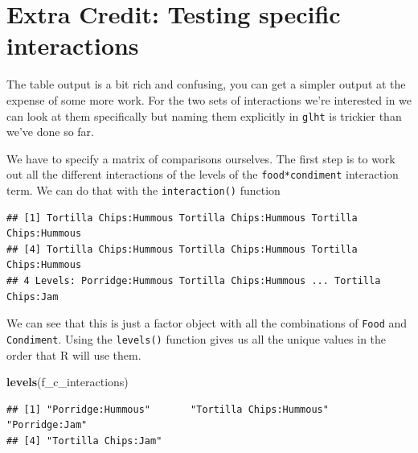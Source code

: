 \documentclass[
]{book}
\newenvironment{Shaded}{\begin{snugshade}}{\end{snugshade}}
\newcommand{\DataTypeTok}[1]{\textcolor[rgb]{0.13,0.29,0.53}{#1}}
\newcommand{\KeywordTok}[1]{\textcolor[rgb]{0.13,0.29,0.53}{\textbf{#1}}}
\newcommand{\NormalTok}[1]{#1}
\newcommand{\OperatorTok}[1]{\textcolor[rgb]{0.81,0.36,0.00}{\textbf{#1}}}
\newcommand{\StringTok}[1]{\textcolor[rgb]{0.31,0.60,0.02}{#1}}
\begin{document}
\hypertarget{extra-credit-testing-specific-interactions}{%
\section{Extra Credit: Testing specific interactions}\label{extra-credit-testing-specific-interactions}}

The table output is a bit rich and confusing, you can get a simpler output at the expense of some more work. For the two sets of interactions we're interested in we can look at them specifically but naming them explicitly in \texttt{glht} is trickier than we've done so far.

We have to specify a matrix of comparisons ourselves. The first step is to work out all the different interactions of the levels of the \texttt{food*condiment} interaction term. We can do that with the \texttt{interaction()} function

\begin{Shaded}
\end{Shaded}

\begin{verbatim}
## [1] Tortilla Chips:Hummous Tortilla Chips:Hummous Tortilla Chips:Hummous
## [4] Tortilla Chips:Hummous Tortilla Chips:Hummous Tortilla Chips:Hummous
## 4 Levels: Porridge:Hummous Tortilla Chips:Hummous ... Tortilla Chips:Jam
\end{verbatim}

We can see that this is just a factor object with all the combinations of \texttt{Food} and \texttt{Condiment}. Using the \texttt{levels()} function gives us all the unique values in the order that R will use them.

\begin{Shaded}
\begin{Highlighting}[]
\KeywordTok{levels}\NormalTok{(f_c_interactions)}
\end{Highlighting}
\end{Shaded}

\begin{verbatim}
## [1] "Porridge:Hummous"       "Tortilla Chips:Hummous" "Porridge:Jam"          
## [4] "Tortilla Chips:Jam"
\end{verbatim}
\end{document}
